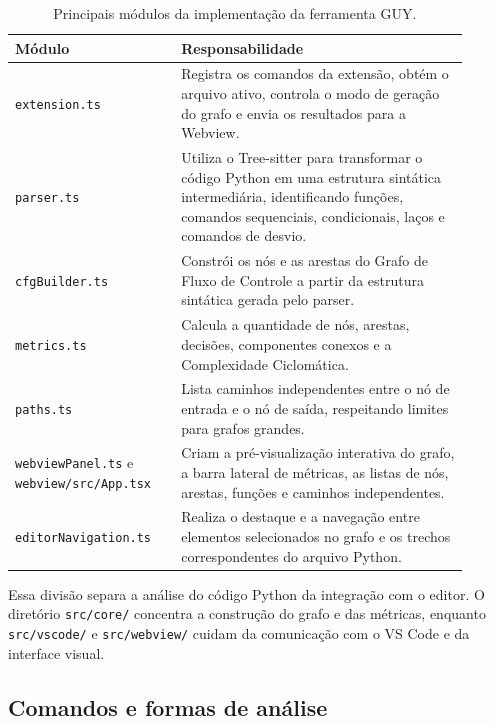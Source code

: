 \begin{table}[H]
    \centering
    \caption{Principais módulos da implementação da ferramenta GUY.}
    \begin{tabular}{p{0.32\linewidth} | p{0.58\linewidth}}
        \hline
        \textbf{Módulo} & \textbf{Responsabilidade} \\ \hline
        \texttt{extension.ts} & Registra os comandos da extensão, obtém o arquivo ativo, controla o modo de geração do grafo e envia os resultados para a Webview. \\ \hline
        \texttt{parser.ts} & Utiliza o Tree-sitter para transformar o código Python em uma estrutura sintática intermediária, identificando funções, comandos sequenciais, condicionais, laços e comandos de desvio. \\ \hline
        \texttt{cfgBuilder.ts} & Constrói os nós e as arestas do Grafo de Fluxo de Controle a partir da estrutura sintática gerada pelo parser. \\ \hline
        \texttt{metrics.ts} & Calcula a quantidade de nós, arestas, decisões, componentes conexos e a Complexidade Ciclomática. \\ \hline
        \texttt{paths.ts} & Lista caminhos independentes entre o nó de entrada e o nó de saída, respeitando limites para grafos grandes. \\ \hline
        \texttt{webviewPanel.ts} e \texttt{webview/src/App.tsx} & Criam a pré-visualização interativa do grafo, a barra lateral de métricas, as listas de nós, arestas, funções e caminhos independentes. \\ \hline
        \texttt{editorNavigation.ts} & Realiza o destaque e a navegação entre elementos selecionados no grafo e os trechos correspondentes do arquivo Python. \\ \hline
    \end{tabular}
    \label{tab:estrutura_guy}
\end{table}

Essa divisão separa a análise do código Python da integração com o editor. O diretório \texttt{src/core/} concentra a construção do grafo e das métricas, enquanto \texttt{src/vscode/} e \texttt{src/webview/} cuidam da comunicação com o VS Code e da interface visual.

\subsection{Comandos e formas de análise}

